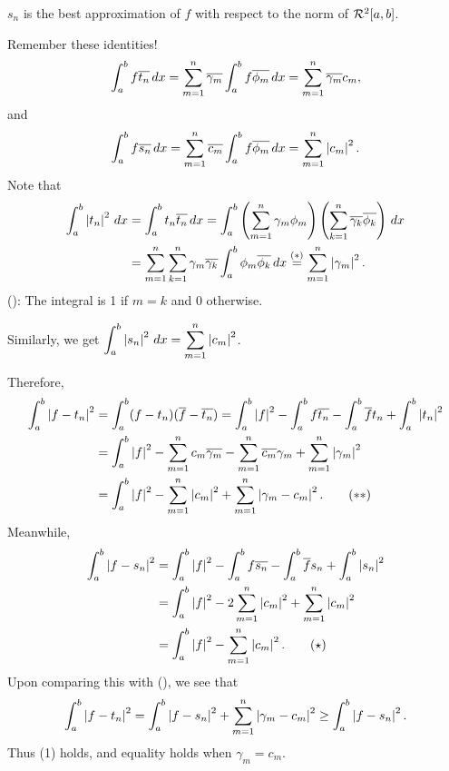\rmk \(s_n\) is the best approximation of \(f\) with respect to the norm of \(\mathcal{R}^2[a, b]\).

\pf Remember these identities!
\[
    \int_a^b f \overline{t_n} \,d{x} = \sum_{m=1}^n \overline{\gamma_m} \int_a^b f \overline{\phi_m}\,d{x} = \sum_{m=1}^n \overline{\gamma_m}c_m,
\]
and
\[
    \int_a^b f \overline{s_n} \,d{x} = \sum_{m=1}^n \overline{c_m} \int_a^b f\overline{\phi_m} \,d{x} = \sum_{m=1}^n \left| c_m \right|^2.
\]
Note that
\[
    \begin{aligned}
        \int_a^b \left| t_n \right|^2 \,d{x} &= \int_a^b t_n \overline{t_n} \,d{x} = \int_a^b \left(\sum_{m=1}^n \gamma_m \phi_m\right)\left(\sum_{k=1}^n \overline{\gamma_k}\overline{\phi_k}\right) \,d{x} \\
        &= \sum_{m=1}^n \sum_{k=1}^n \gamma_m \overline{\gamma_k} \int_a^b \phi_m\overline{\phi_k} \,d{x} \overset{(\ast)}{=} \sum_{m=1}^n \left| \gamma_m \right|^2.
    \end{aligned}
\]
(\mast): The integral is 1 if \(m = k\) and 0 otherwise.

Similarly, we get \(\displaystyle \int_a^b \left| s_n \right|^2 \,d{x} = \sum_{m=1}^n \left| c_m \right|^2\).

Therefore,
\[
    \begin{aligned}
        \int_a^b \left| f-t_n \right|^2 &= \int_a^b (f-t_n)(\overline{f} - \overline{t_n}) = \int_a^b \left| f \right|^2 - \int_a^b f \overline{t_n} - \int_a^b \overline{f} t_n + \int_a^b \left| t_n \right|^2 \\
        &= \int_a^b \left| f \right|^2 - \sum_{m=1}^n c_m \overline{\gamma_m} - \sum_{m=1}^n \overline{c_m} \gamma_m + \sum_{m=1}^n \left| \gamma_m \right|^2 \\
        &= \int_a^b \left| f \right|^2 - \sum_{m=1}^n \left| c_m \right|^2 + \sum_{m=1}^n \left| \gamma_m - c_m \right|^2. \qquad (\ast\ast)
    \end{aligned}
\]
Meanwhile,
\[
    \begin{aligned}
        \int_a^b \left| f - s_n \right|^2 &= \int_a^b \left| f \right|^2 - \int_a^b f \overline{s_n} - \int_a^b \overline{f} s_n + \int_a^b \left| s_n \right|^2 \\
        &= \int_a^b \left| f \right|^2 - 2\sum_{m=1}^n \left| c_m \right|^2 + \sum_{m=1}^n \left| c_m \right|^2 \\
        &= \int_a^b \left| f \right|^2 - \sum_{m=1}^n \left| c_m \right|^2. \qquad (\star)
    \end{aligned}
\]
Upon comparing this with (\mast\mast), we see that
\[
    \int_a^b \left| f-t_n \right|^2 = \int_a^b \left| f-s_n \right|^2 + \sum_{m=1}^n \left| \gamma_m - c_m \right|^2 \geq \int_a^b \left| f-s_n \right|^2.
\]
Thus (1) holds, and equality holds when \(\gamma_m = c_m\).

